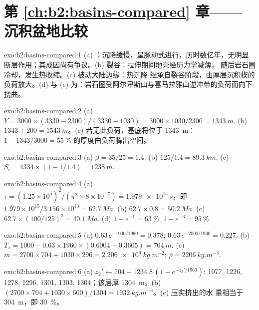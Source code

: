 \section*{第 \ref{ch:b2:basins-compared} 章——沉积盆地比较}

\begin{solution}{exo:b2:basins-compared:1}
(a) ：沉降缓慢，呈脉动式进行，历时数亿年，无明显
断层作用；其成因尚有争议。(b) 裂谷：拉伸期间地壳经历力学减薄，
随后岩石圈冷却，发生热收缩。(c) 被动大陆边缘：热沉降
继承自裂谷阶段，由厚层沉积楔的负荷放大。(d) 与 (e)
为：岩石圈受阿尔卑斯山与喜马拉雅山逆冲带的负荷而向下挠曲。
\end{solution}

\begin{solution}{exo:b2:basins-compared:2}
(a) $Y = 3000\times(3330 - 2300)/(3330 - 1030) = 3000\times1030/2300 = \qty{1343}{m}$.
(b) $1343 + 200 = \qty{1543}{m}$。(c) 若无此负荷，基底将位于 \qty{1343}{m}：
$1 - 1343/3000 = \qty{55}{\percent}$ 的厚度由负荷腾出空间。
\end{solution}

\begin{solution}{exo:b2:basins-compared:3}
(a) $\beta = 35/25 = 1.4$. (b) $125/1.4 = \qty{89.3}{km}$. (c) $S_i = 4334\times(1 - 1/1.4) =
\qty{1238}{m}$.
\end{solution}

\begin{solution}{exo:b2:basins-compared:4}
(a) $\tau = (1.25\times10^{5})^2/(\pi^2\times8\times10^{-7}) = \qty{1.979e15}{s}$，即
$1.979\times10^{15}/3.156\times10^{13} = \qty{62.7}{Ma}$. (b) $62.7\times0.8 = \qty{50.2}{Ma}$.
(c) $62.7\times(100/125)^2 = \qty{40.1}{Ma}$. (d) $1 - e^{-1} = \qty{63}{\percent}$; $1 -
e^{-3} = \qty{95}{\percent}$.
\end{solution}

\begin{solution}{exo:b2:basins-compared:5}
(a) $0.63\,e^{-1000/1960} = 0.378$; $0.63\,e^{-2000/1960} = 0.227$. (b) $T_s = 1000 -
0.63\times1960\times(0.6004 - 0.3605) = \qty{704}{m}$. (c) $m = 2700\times704 + 1030\times296 =
\qty{2.206e6}{kg.m^{-2}}$; $\bar\rho = \qty{2206}{kg.m^{-3}}$.
\end{solution}

\begin{solution}{exo:b2:basins-compared:6}
(a) $z_2' \leftarrow 704 + 1234.8\,(1 - e^{-z_2'/1960})$: 1077, 1226, 1278, 1296, 1301, 1303,
1304；该层厚 \qty{1304}{m}。(b) $(2700\times704 + 1030\times600)/1304 =
\qty{1932}{kg.m^{-3}}$。(c) 压实挤出的水
量相当于 \qty{304}{m}，即 \qty{30}{\percent}。
\end{solution}

